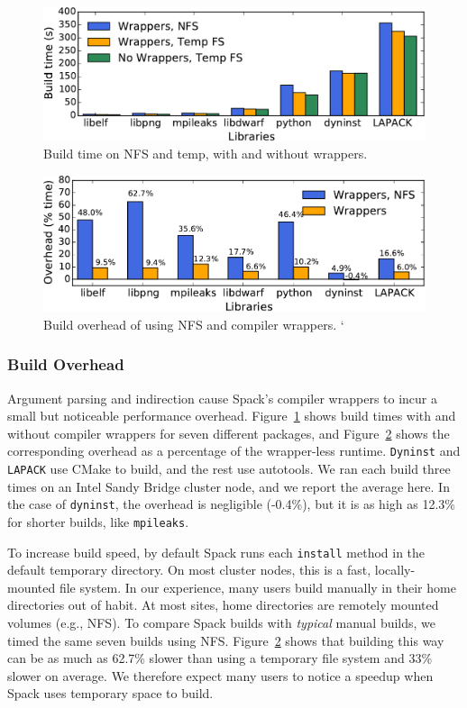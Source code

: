 \begin{figure}%
	\centering
	\includegraphics[width=.95\columnwidth]{figs/overhead/build-time.pdf}
	\caption{
		Build time on NFS and temp, with and without wrappers.
		\label{fig:build-times}
	}
\end{figure}
\begin{figure}%
	\centering
	\includegraphics[width=.95\columnwidth]{figs/overhead/overhead.pdf}
	\caption{
		Build overhead of using NFS and compiler wrappers.
		\label{fig:overhead}`
	}
\end{figure}

\subsubsection{Build Overhead}

Argument parsing and indirection cause Spack's compiler wrappers to incur a small
but noticeable performance overhead.  Figure~\ref{fig:build-times} shows
build times with and without compiler wrappers for seven different packages,
and Figure~\ref{fig:overhead} shows the corresponding overhead as a percentage
of the wrapper-less runtime.  {\tt Dyninst} and {\tt LAPACK}
use CMake to build, and the rest use autotools.  We ran
each build three times on an Intel Sandy Bridge cluster node, and we
report the average here.
In the case of {\tt dyninst}, the overhead is negligible (-0.4\%),
but it is as high as 12.3\% for shorter builds, like
{\tt mpileaks}.

To increase build speed, by default Spack runs each {\tt install}
method in the default temporary directory. On most cluster nodes,
this is a fast, locally-mounted file system. In our experience,
many users build manually in their home directories out of habit.  At most sites, home
directories are remotely mounted volumes (e.g., NFS).  To compare Spack builds
with {\it typical} manual builds, we timed the same seven builds using
NFS.  Figure~\ref{fig:overhead} shows that building this way can be as much
as 62.7\% slower than using a temporary file system and
33\% slower on average. We therefore expect many users to notice
a speedup when Spack uses temporary space to build.



